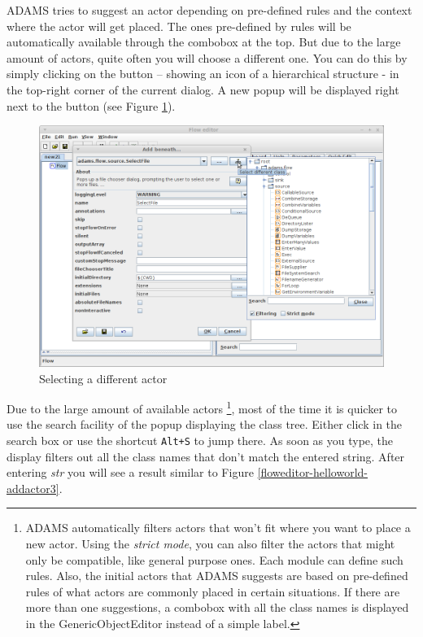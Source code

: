 ADAMS tries to suggest an actor depending on pre-defined rules and the context 
where the actor will get placed. The ones pre-defined by rules will be 
automatically available through the combobox at the top. But due to the large 
amount of actors, quite often you will choose a different one. You can do this 
by simply clicking on the button --
showing an icon of a hierarchical structure - in the top-right corner of the current dialog. A
new popup will be displayed right next to the button (see Figure
\ref{floweditor-helloworld-addactor2}).

\begin{figure}[htb]
  \centering
  \includegraphics[width=12.0cm]{images/floweditor-helloworld-addactor2.png}
  \caption{Selecting a different actor}
  \label{floweditor-helloworld-addactor2}
\end{figure}

Due to the large amount of available actors \footnote{ADAMS automatically
filters actors that won't fit where you want to place a new actor. Using the
\textit{strict mode}, you can also filter the actors that might only be
compatible, like general purpose ones. Each module can define such rules. Also,
the initial actors that ADAMS suggests are based on pre-defined rules of what
actors are commonly placed in certain situations. If there are more than one
suggestions, a combobox with all the class names is displayed in the
GenericObjectEditor instead of a simple label.}, most of the time it is quicker
to use the search facility of the popup displaying the class tree. Either click
in the search box or use the shortcut \texttt{Alt+S} to jump there. As soon as
you type, the display filters out all the class names that don't match the
entered string. After entering \textit{str} you will see a result similar to
Figure \ref{floweditor-helloworld-addactor3}.

